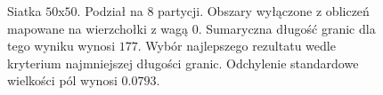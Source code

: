 \begin{figure}[h]
\begin{subfigure}{.33\textwidth}
    \caption[short]{}
\end{subfigure}
\caption{Siatka $50$x$50$. Podział na $8$ partycji. Obszary wyłączone z obliczeń mapowane na wierzchołki z wagą $0$.
Sumaryczna długość granic dla tego wyniku wynosi $177$.
Wybór najlepszego rezultatu wedle kryterium najmniejszej długości granic.
Odchylenie standardowe wielkości pól wynosi $0.0793$.}
\label{result:4}
\end{figure}

\begin{figure}[h]
\centering
\begin{subfigure}{.33\textwidth}
    \centering
    \caption[short]{}
\end{subfigure}%
\begin{subfigure}{.33\textwidth}
    \centering
    \caption[short]{}
\end{subfigure}%
\begin{subfigure}{.33\textwidth}

\end{subfigure}
\end{figure}
